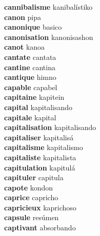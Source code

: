 \textbf{cannibalisme } kanibalístiko \\
\textbf{canon } pipa \\
\textbf{canonique } basico \\
\textbf{canonisation } kanonisashon \\
\textbf{canot } kanoa \\
\textbf{cantate } cantata \\
\textbf{cantine } cantina \\
\textbf{cantique } himno \\
\textbf{capable } capabel \\
\textbf{capitaine } kapitein \\
\textbf{capital } kapitalisando \\
\textbf{capitale } kapital \\
\textbf{capitalisation } kapitalisando \\
\textbf{capitaliser } kapitalisá \\
\textbf{capitalisme } kapitalismo \\
\textbf{capitaliste } kapitalista \\
\textbf{capitulation } kapitulá \\
\textbf{capituler } capitula \\
\textbf{capote } kondon \\
\textbf{caprice } capricho \\
\textbf{capricieux } kaprichoso \\
\textbf{capsule } resúmen \\
\textbf{captivant } absorbando \\
